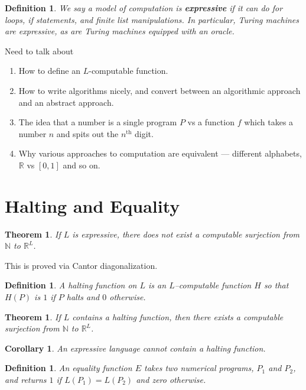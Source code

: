 \documentclass[11pt]{article}
\theoremstyle{plain}
\newtheorem{thm}[prop]{Theorem}
\newtheorem{defn}[prop]{Definition}
\newtheorem{cly}[prop]{Corollary}
\newcommand{\bb}[1]{\mathbb{#1}}
\newcommand{\bo}[1]{{\bf #1}}
\begin{document}
\begin{defn} We say a model of computation is \bo{expressive} if it can do for loops, if statements, and finite list manipulations. In particular, Turing machines are expressive, as are Turing machines equipped with an oracle.\end{defn}

Need to talk about
\begin{enumerate}
\item How to define an $L$-computable function.
\item How to write algorithms nicely, and convert between an algorithmic approach and an abstract approach.
\item The idea that a number is a single program $P$ vs a function $f$ which takes a number $n$ and spits out the $n^{\text{th}}$ digit.
\item Why various approaches to computation are equivalent --- different alphabets, $\bb R$ vs $[0,1]$ and so on.
\end{enumerate}

\section{Halting and Equality}

\begin{thm} If $L$ is expressive, there does not exist a computable surjection from $\bb N$ to $\bb R^L$.\end{thm}

This is proved via Cantor diagonalization.

\begin{defn} A halting function on $L$ is an $L$--computable function $H$ so that $H(P)$ is $1$ if $P$ halts and $0$ otherwise.\end{defn}

\begin{thm} If $L$ contains a halting function, then there exists a computable surjection from $\bb N$ to $\bb R^L$.\end{thm}

\begin{cly} An expressive language cannot contain a halting function. \end{cly}

\begin{defn} An equality function $E$ takes two numerical programs, $P_1$ and $P_2$, and returns $1$ if $L(P_1) = L(P_2)$ and zero otherwise. \end{defn}
\end{document}
